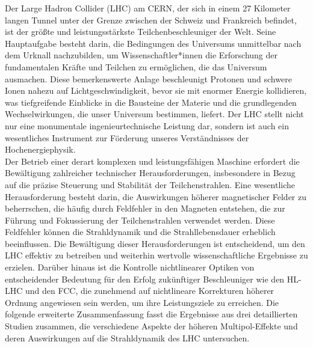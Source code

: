 {
\fontsize{\fontsizesummary}{\fontskipsummary}\selectfont

Der Large Hadron Collider (LHC) am CERN, der sich in einem 27 Kilometer langen Tunnel unter der Grenze zwischen der Schweiz und Frankreich befindet, ist der größte und leistungsstärkste Teilchenbeschleuniger der Welt. Seine Hauptaufgabe besteht darin, die Bedingungen des Universums unmittelbar nach dem Urknall nachzubilden, um Wissenschaftler*innen die Erforschung der fundamentalen Kräfte und Teilchen zu ermöglichen, die das Universum ausmachen. Diese bemerkenswerte Anlage beschleunigt Protonen und schwere Ionen nahezu auf Lichtgeschwindigkeit, bevor sie mit enormer Energie kollidieren, was tiefgreifende Einblicke in die Bausteine der Materie und die grundlegenden Wechselwirkungen, die unser Universum bestimmen, liefert. Der LHC stellt nicht nur eine monumentale ingenieurtechnische Leistung dar, sondern ist auch ein wesentliches Instrument zur Förderung unseres Verständnisses der Hochenergiephysik.
\\
\indent
Der Betrieb einer derart komplexen und leistungsfähigen Maschine erfordert die Bewältigung zahlreicher technischer Herausforderungen, insbesondere in Bezug auf die präzise Steuerung und Stabilität der Teilchenstrahlen. Eine wesentliche Herausforderung besteht darin, die Auswirkungen höherer magnetischer Felder zu beherrschen, die häufig durch Feldfehler in den Magneten entstehen, die zur Führung und Fokussierung der Teilchenstrahlen verwendet werden. Diese Feldfehler können die Strahldynamik und die Strahllebensdauer erheblich beeinflussen. Die Bewältigung dieser Herausforderungen ist entscheidend, um den LHC effektiv zu betreiben und weiterhin wertvolle wissenschaftliche Ergebnisse zu erzielen. Darüber hinaus ist die Kontrolle nichtlinearer Optiken von entscheidender Bedeutung für den Erfolg zukünftiger Beschleuniger wie den HL-LHC und den FCC, die zunehmend auf nichtlineare Korrekturen höherer Ordnung angewiesen sein werden, um ihre Leistungsziele zu erreichen. Die folgende erweiterte Zusammenfassung fasst die Ergebnisse aus drei detaillierten Studien zusammen, die verschiedene Aspekte der höheren Multipol-Effekte und deren Auswirkungen auf die Strahldynamik des LHC untersuchen.

}
